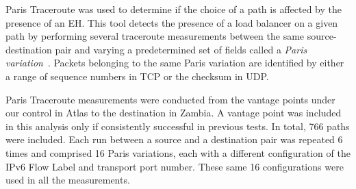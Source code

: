 \documentclass[conference]{IEEEtran}
\begin{document}
% 


Paris Traceroute was used to determine if the choice of a path is affected by
the presence of an EH.  This tool detects the presence of a load balancer on a
given path by performing several traceroute measurements between the same
source-destination pair and varying a predetermined set of fields called a
\textit{Paris variation}~\cite{augustin2006avoiding}.  Packets belonging to the
same Paris variation are identified by either a range of sequence numbers in
TCP or the checksum in UDP.


Paris Traceroute measurements were conducted from the vantage points under our
control in Atlas to the destination in Zambia.  A vantage point was included in
this analysis only if consistently successful in previous tests.  In total, 766
paths were included.  Each run between a source and a destination pair was repeated 6
times and comprised 16 Paris variations, each with a different configuration of
the IPv6 Flow Label and transport port number.  These same 16 configurations
were used in all the measurements. 


\end{document}
